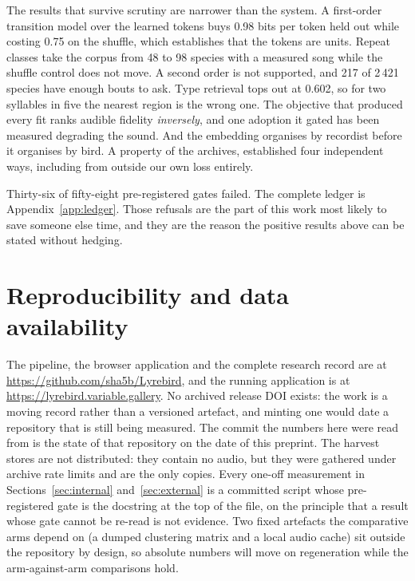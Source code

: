 \documentclass[10pt,twocolumn,a4paper]{article}
\begin{document}
The results that survive scrutiny are narrower than the system. A first-order transition model
over the learned tokens buys 0.98 bits per token held out while costing 0.75 on the shuffle,
which establishes that the tokens are units. Repeat classes take the corpus from 48 to 98
species with a measured song while the shuffle control does not move. A second order is not
supported, and 217 of 2\,421 species have enough bouts to ask. Type retrieval tops out at
0.602, so for two syllables in five the nearest region is the wrong one. The objective that
produced every fit ranks audible fidelity \emph{inversely}, and one adoption it gated has been
measured degrading the sound. And the embedding organises by recordist
before it organises by bird. A property of the archives, established four independent ways,
including from outside our own loss entirely.

Thirty-six of fifty-eight pre-registered gates failed. The complete ledger is
Appendix~\ref{app:ledger}. Those refusals are the part of this work most likely to save
someone else time, and they are the reason the positive results above can be stated without
hedging.

\section*{Reproducibility and data availability}

The pipeline, the browser application and the complete research record are at
\url{https://github.com/sha5b/Lyrebird}, and the running application is at
\url{https://lyrebird.variable.gallery}. No archived release DOI exists: the work is a moving
record rather than a versioned artefact, and minting one would date a repository that is still
being measured. The commit the numbers here were read from is the state of that repository on
the date of this preprint. The harvest stores are not distributed:
they contain no audio, but they were gathered under archive rate limits and are the only
copies. Every one-off measurement in Sections~\ref{sec:internal} and~\ref{sec:external} is a
committed script whose pre-registered gate is the docstring at the top of the file, on the
principle that a result whose gate cannot be re-read is not evidence. Two fixed artefacts the
comparative arms depend on (a dumped clustering matrix and a local audio cache) sit
outside the repository by design, so absolute numbers will move on regeneration while the
arm-against-arm comparisons hold.
\end{document}
